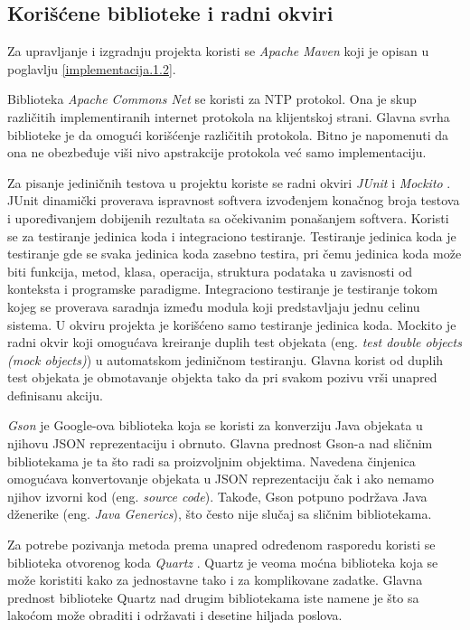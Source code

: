 \documentclass[12pt,oneside]{memoir}
\begin{document}
\subsection{Korišćene biblioteke i radni okviri}
\label{implementacija.2.1}

Za upravljanje i izgradnju projekta koristi se \textit{Apache Maven} \cite{Maven} koji je opisan u poglavlju \ref{implementacija.1.2}. 

Biblioteka \textit{Apache Commons Net} \cite{CommonsNet} se koristi za NTP protokol. Ona je skup različitih implementiranih internet protokola na klijentskoj strani. Glavna svrha biblioteke je da omogući korišćenje različitih protokola. Bitno je napomenuti da ona ne obezbeđuje viši nivo apstrakcije protokola već samo implementaciju.  

Za pisanje jediničnih testova u projektu koriste se radni okviri \textit{JUnit} \cite{Junit} i \textit{Mockito} \cite{Mockito}. JUnit dinamički proverava ispravnost softvera izvođenjem konačnog broja testova i upoređivanjem dobijenih rezultata sa očekivanim ponašanjem softvera. Koristi se za testiranje jedinica koda i integraciono testiranje. Testiranje jedinica koda je testiranje gde se svaka jedinica koda zasebno testira, pri čemu jedinica koda može biti funkcija, metod, klasa, operacija, struktura podataka u zavisnosti od konteksta i programske paradigme. Integraciono testiranje je testiranje tokom kojeg se proverava saradnja između modula koji predstavljaju jednu celinu sistema. U okviru projekta je korišćeno samo testiranje jedinica koda. Mockito je radni okvir koji omogućava kreiranje duplih test objekata (eng. \textit{test double objects (mock objects)}) u automatskom jediničnom testiranju. Glavna korist od duplih test objekata je obmotavanje objekta tako da pri svakom pozivu vrši unapred definisanu akciju.

\textit{Gson} \cite{Gson} je Google-ova biblioteka koja se koristi za konverziju Java objekata u njihovu JSON reprezentaciju i obrnuto. Glavna prednost Gson-a nad sličnim bibliotekama je ta što radi sa proizvoljnim objektima. Navedena činjenica omogućava konvertovanje objekata u JSON reprezentaciju čak i ako nemamo njihov izvorni kod (eng. \textit{source code}). Takođe, Gson potpuno podržava Java dženerike (eng. \textit{Java Generics}), što često nije slučaj sa sličnim bibliotekama.

Za potrebe pozivanja metoda prema unapred određenom rasporedu koristi se biblioteka otvorenog koda \textit{Quartz} \cite{Quartz}. Quartz je veoma moćna biblioteka koja se može koristiti kako za jednostavne tako i za komplikovane zadatke. Glavna prednost biblioteke Quartz nad drugim bibliotekama iste namene je što sa lakoćom može obraditi i održavati i desetine hiljada poslova. 
\end{document}
